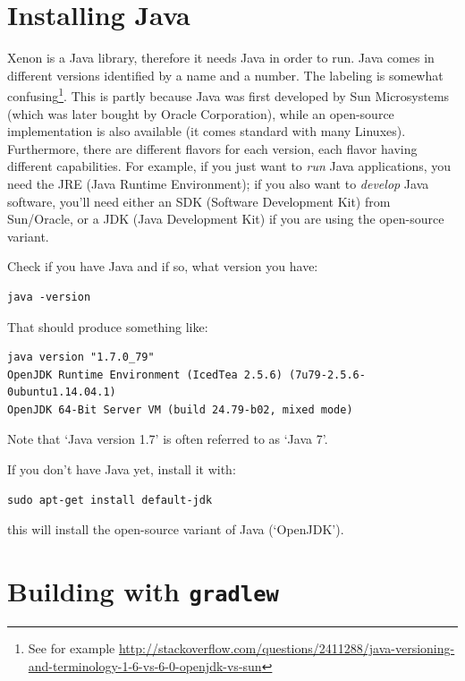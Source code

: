 \documentclass[12pt, a4paper, twoside, openany, titlepage]{book}
\begin{document}
\section{Installing Java}

Xenon is a Java library, therefore it needs Java in order to run. Java comes in different versions identified by a name and a number. The labeling is somewhat confusing\footnote{See for example \url{http://stackoverflow.com/questions/2411288/java-versioning-and-terminology-1-6-vs-6-0-openjdk-vs-sun}}. This is partly because Java was first developed by Sun Microsystems (which was later bought by Oracle Corporation), while an open-source implementation is also available (it comes standard with many Linuxes). Furthermore, there are different flavors for each version, each flavor having different capabilities. For example, if you just want to \textit{run} Java applications, you need the JRE (Java Runtime Environment); if you also want to \textit{develop} Java software, you'll need either an SDK (Software Development Kit) from Sun/Oracle, or a JDK (Java Development Kit) if you are using the open-source variant.

Check if you have Java and if so, what version you have:
\begin{lstlisting}[style=basic,style=bash]
java -version
\end{lstlisting}
That should produce something like:
\begin{lstlisting}[style=basic,style=bash]
java version "1.7.0_79"
OpenJDK Runtime Environment (IcedTea 2.5.6) (7u79-2.5.6-0ubuntu1.14.04.1)
OpenJDK 64-Bit Server VM (build 24.79-b02, mixed mode)
\end{lstlisting}
Note that `Java version 1.7' is often referred to as `Java 7'.

If you don't have Java yet, install it with:
\begin{lstlisting}[style=basic,style=bash]
sudo apt-get install default-jdk
\end{lstlisting}
this will install the open-source variant of Java (`OpenJDK').












\section{Building with \texttt{gradlew}}
\end{document}
